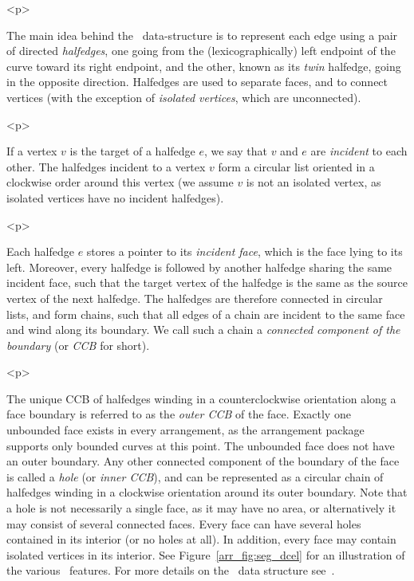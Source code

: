\begin{ccHtmlOnly}<p>\end{ccHtmlOnly}
The main idea behind the \dcel\ data-structure is to represent
each edge using a pair of directed {\em halfedges}, one going from
the (lexicographically) left endpoint of the curve toward its right
endpoint, and the other, known as its {\em twin} halfedge, going in
the opposite direction. Halfedges are used to separate faces, and to
connect vertices (with the exception of {\em isolated vertices}, which
are unconnected).

\begin{ccHtmlOnly}<p>\end{ccHtmlOnly}
If a vertex $v$ is the target of a halfedge $e$, we say that $v$
and $e$ are {\em incident} to each other. The halfedges incident
to a vertex $v$ form a circular list oriented in a clockwise order
around this vertex (we assume $v$ is not an isolated vertex, as
isolated vertices have no incident halfedges).

\begin{ccHtmlOnly}<p>\end{ccHtmlOnly}
Each halfedge $e$ stores a pointer to its {\it incident face},
which is the face lying to its left. Moreover, every halfedge is
followed by another halfedge sharing the same incident face, such
that the target vertex of the halfedge is the same as the source
vertex of the next halfedge. The halfedges are therefore connected
in circular lists, and form chains, such that all edges of a chain
are incident to the same face and wind along its boundary. We call
such a chain a {\em connected component of the boundary} (or {\em
CCB} for short).

\begin{ccHtmlOnly}<p>\end{ccHtmlOnly}
The unique CCB of halfedges winding in a counterclockwise orientation
along a face boundary is referred to as the {\em outer CCB} of the
face. Exactly one unbounded face exists in every arrangement, as the
arrangement package supports only bounded curves at this point. The
unbounded face does not have an outer boundary. Any other connected
component of the boundary of the face is called a {\em hole} (or {\em
inner CCB}), and can be represented as a circular chain of halfedges
winding in a clockwise orientation around its outer boundary. Note
that a hole is not necessarily a single face, as it may have no area,
or alternatively it may consist of several connected faces.  Every
face can have several holes contained in its interior (or no holes at
all). In addition, every face may contain isolated vertices in its
interior. See Figure~\ref{arr_fig:seg_dcel} for an illustration of the
various \dcel\ features. For more details on the \dcel\ data structure
see~\cite[Chapter~2]{bkos-cgaa-00}.

